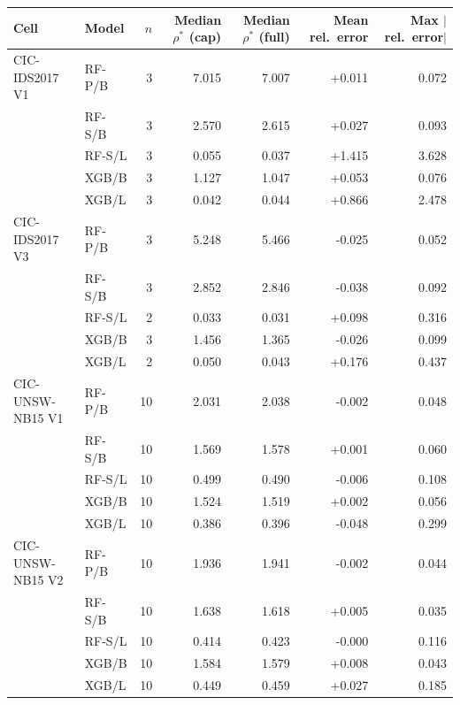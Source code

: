\begin{tabular}{@{}llrrrrr@{}}
\toprule
Cell & Model & $n$ & Median $\rho^*$ (cap) & Median $\rho^*$ (full) & Mean rel.\ error & Max $|$rel.\ error$|$ \\
\midrule
CIC-IDS2017 V1 & RF-P/B & 3 & 7.015 & 7.007 & +0.011 & 0.072 \\
 & RF-S/B & 3 & 2.570 & 2.615 & +0.027 & 0.093 \\
 & RF-S/L & 3 & 0.055 & 0.037 & +1.415 & 3.628 \\
 & XGB/B & 3 & 1.127 & 1.047 & +0.053 & 0.076 \\
 & XGB/L & 3 & 0.042 & 0.044 & +0.866 & 2.478 \\
\addlinespace
CIC-IDS2017 V3 & RF-P/B & 3 & 5.248 & 5.466 & -0.025 & 0.052 \\
 & RF-S/B & 3 & 2.852 & 2.846 & -0.038 & 0.092 \\
 & RF-S/L & 2 & 0.033 & 0.031 & +0.098 & 0.316 \\
 & XGB/B & 3 & 1.456 & 1.365 & -0.026 & 0.099 \\
 & XGB/L & 2 & 0.050 & 0.043 & +0.176 & 0.437 \\
\addlinespace
CIC-UNSW-NB15 V1 & RF-P/B & 10 & 2.031 & 2.038 & -0.002 & 0.048 \\
 & RF-S/B & 10 & 1.569 & 1.578 & +0.001 & 0.060 \\
 & RF-S/L & 10 & 0.499 & 0.490 & -0.006 & 0.108 \\
 & XGB/B & 10 & 1.524 & 1.519 & +0.002 & 0.056 \\
 & XGB/L & 10 & 0.386 & 0.396 & -0.048 & 0.299 \\
\addlinespace
CIC-UNSW-NB15 V2 & RF-P/B & 10 & 1.936 & 1.941 & -0.002 & 0.044 \\
 & RF-S/B & 10 & 1.638 & 1.618 & +0.005 & 0.035 \\
 & RF-S/L & 10 & 0.414 & 0.423 & -0.000 & 0.116 \\
 & XGB/B & 10 & 1.584 & 1.579 & +0.008 & 0.043 \\
 & XGB/L & 10 & 0.449 & 0.459 & +0.027 & 0.185 \\
\bottomrule
\end{tabular}
